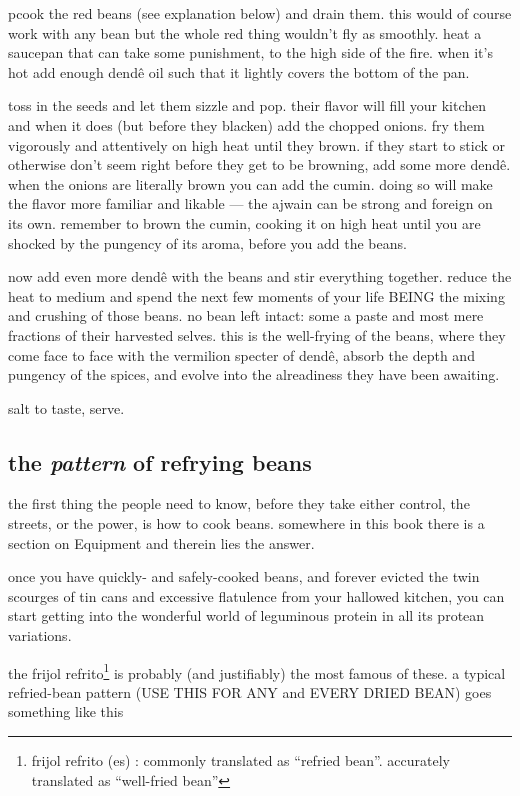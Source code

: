 pcook the red beans (see explanation below) and drain them. this would
of course work with any bean but the whole red thing wouldn't fly as
smoothly. heat a saucepan that can take some punishment, to the high
side of the fire. when it's hot add enough dend\^{e} oil such that it
lightly covers the bottom of the pan.

toss in the seeds and let them sizzle and pop. their flavor will fill
your kitchen and when it does (but before they blacken) add the
chopped onions. fry them vigorously and attentively on high heat until
they brown. if they start to stick or otherwise don't seem right
before they get to be browning, add some more dend\^{e}. when the
onions are literally brown you can add the cumin. doing so will make
the flavor more familiar and likable --- the ajwain can be strong and
foreign on its own. remember to brown the cumin, cooking it on high
heat until you are shocked by the pungency of its aroma, before you
add the beans.

now add even more dend\^{e} with the beans and stir everything
together. reduce the heat to medium and spend the next few moments of
your life BEING the mixing and crushing of those beans. no bean left
intact: some a paste and most mere fractions of their harvested
selves. this is the well-frying of the beans, where they come face to
face with the vermilion specter of dend\^{e}, absorb the depth and
pungency of the spices, and evolve into the alreadiness they have been
awaiting.

salt to taste, serve.

\subsection{the \textit{pattern} of refrying beans}

the first thing the people need to know, before they take either
control, the streets, or the power, is how to cook beans. somewhere in
this book there is a section on Equipment and therein lies the answer.

once you have quickly- and safely-cooked beans, and forever evicted
the twin scourges of tin cans and excessive flatulence from your
hallowed kitchen, you can start getting into the wonderful world of
leguminous protein in all its protean variations.

the frijol refrito\footnote{frijol refrito (es) : commonly translated
as ``refried bean''. accurately translated as ``well-fried bean''} is
probably (and justifiably) the most famous of these. a typical
refried-bean pattern (USE THIS FOR ANY and EVERY DRIED BEAN) goes
something like this

